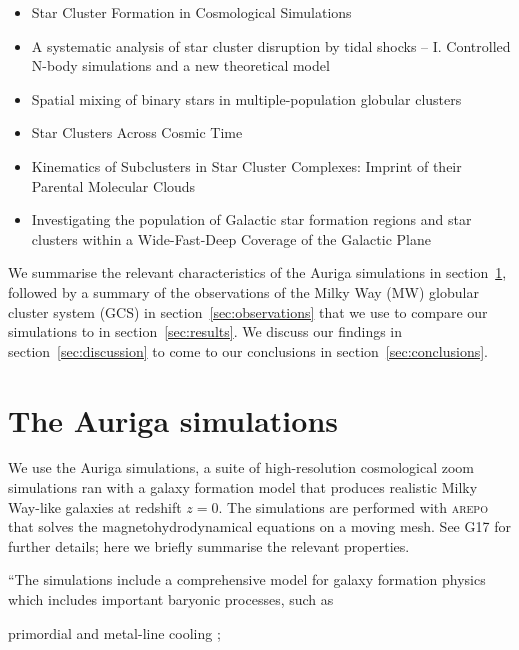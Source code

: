 \documentclass[a4paper,fleqn,usenatbib]{mnras}
\begin{document}
\begin{itemize}
\item Star Cluster Formation in Cosmological Simulations \citep{2017ApJ...834...69L, 2018ApJ...861..107L, 2018arXiv181011036L}
\item A systematic analysis of star cluster disruption by tidal shocks -- I. Controlled N-body simulations and a new theoretical model \citep{2018arXiv181200014W}
\item Spatial mixing of binary stars in multiple-population globular clusters \citep{2018MNRAS.tmp.3147H}
\item Star Clusters Across Cosmic Time \citep{2018arXiv181201615K}
\item Kinematics of Subclusters in Star Cluster Complexes: Imprint of their Parental Molecular Clouds \citep{2018arXiv181201858F}
\item Investigating the population of Galactic star formation regions and star clusters within a Wide-Fast-Deep Coverage of the Galactic Plane  \citep{2018arXiv181203025P}
\end{itemize}


We summarise the relevant characteristics of the Auriga simulations in section~\ref{sec:auriga}, followed by a summary of the observations of the Milky Way (MW) globular cluster system (GCS) in section~\ref{sec:observations} that we use to compare our simulations to in section~\ref{sec:results}. We discuss our findings in section~\ref{sec:discussion} to come to our conclusions in section~\ref{sec:conclusions}.


\section{The Auriga simulations}
\label{sec:auriga}
We use the Auriga \citep[][hereafter G17]{2017MNRAS.467..179G} simulations, a suite of high-resolution cosmological zoom simulations ran with a galaxy formation model that produces realistic Milky Way-like galaxies at redshift $z=0$. The simulations are performed with \textsc{arepo} \citep{2010MNRAS.401..791S, 2016MNRAS.455.1134P} that solves the magnetohydrodynamical equations on a moving mesh. See G17 for further details; here we briefly summarise the relevant properties.

``The simulations include a comprehensive model for galaxy formation physics which includes important baryonic processes, such as

primordial and metal-line cooling \citep{2013MNRAS.436.3031V};
\end{document}
